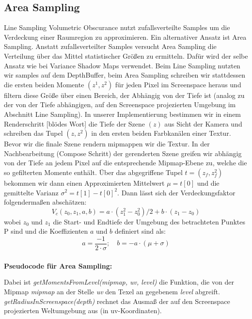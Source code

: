 \documentclass[runningheaders,a4paper]{llncs}
\begin{document}
\subsection{Area Sampling} \label{ssec:ASVO}
Line Sampling Volumetric Obscurance nutzt zufallsverteilte Samples um die Verdeckung einer
Raumregion zu approximieren. Ein alternativer Ansatz ist Area Sampling. Anstatt zufallsverteilter Samples
versucht Area Sampling die Verteilung über das Mittel statistischer Größen zu ermitteln. Dafür
wird der selbe Ansatz wie bei Variance Shadow Maps \cite{vsmPaper} verwendet. Beim Line Sampling
nutzten wir samples auf dem DepthBuffer, beim Area Sampling schreiben wir stattdessen die ersten beiden
Momente $(z^1, z^2)$ für jeden Pixel im Screenspace heraus und filtern diese Größe über einen Bereich, der
Abhängig von der Tiefe ist (analog zu der von der Tiefe abhängigen, auf den Screenspace projezierten Umgebung
im Abschnitt Line Sampling). In unserer Implementierung bestimmen wir in einem Renderschritt [blödes Wort]
die Tiefe der Szene $(z)$ aus Sicht der Kamera und schreiben das Tupel $(z, z^2)$ in den ersten beiden
Farbkanälen einer Textur. Bevor wir die finale Szene rendern mipmappen wir die Textur.
In der Nachbearbeitung (Compose Schritt) der gerenderten Szene greifen wir abhängig von der Tiefe an jedem
Pixel auf die entsprechende Mipmap-Ebene zu, welche die so gefilterten Momente enthält.
Über das abgegriffene Tupel $t = (z_f, z_f^2)$ bekommen wir dann einen Approximierten Mittelwert 
$\mu = t[0]$ und die gemittelte Varianz $\sigma^2 = t[1] - t[0]^2$. Dann lässt sich der Verdeckungsfaktor 
folgendermaßen abschätzen:
$$
V_c(z_0, z_1, a, b) = a\cdot(z_1^2 - z_0^2) / 2 + b \cdot (z_1 - z_0)
$$
wobei $z_0$ und $z_1$ die Start- und Endtiefe der Umgebung des betrachteten Punktes P sind und die 
Koeffizienten $a$ und $b$ definiert sind als:
$$
a = \frac{-1}{2 \cdot \sigma}; \quad b = -a \cdot (\mu + \sigma)
$$

\subsubsection{} \textbf{Pseudocode für Area Sampling:} \\
\begin{algorithm}[H]
\end{algorithm}
Dabei ist \textit{getMomentsFromLevel(mipmap, uv, level)} die Funktion, die von der Mipmap \textit{mipmap}
an der Stelle \textit{uv} den Texel an gegebenem \textit{level} abgreift.
\textit{getRadiusInScreenspace(depth)} rechnet das Ausmaß der auf den Screenspace projezierten Weltumgebung
aus (in uv-Koordinaten).
\end{document}
